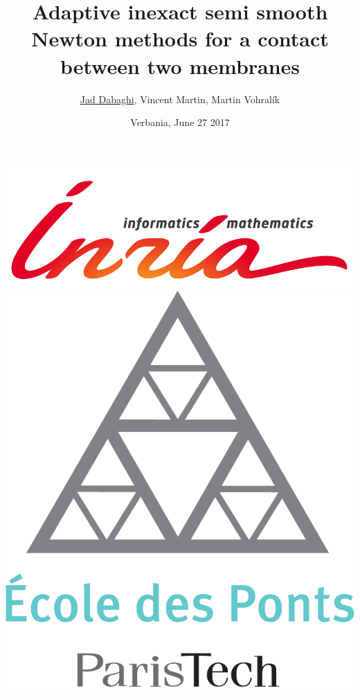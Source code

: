 \documentclass[10 pt]{beamer}
\title[ADMOS 2017]{Adaptive inexact semi smooth Newton methods for a contact between two membranes}
\author[Jad Dabaghi]{\underline{Jad Dabaghi}, Vincent Martin, Martin Vohral\'ik}
\institute[]{Inria Paris \& Université Paris-Est}
\date{Verbania, June 27 2017}
\begin{document}
\begin{frame}
\maketitle
\includegraphics[scale=0.3]{INRIA-SCIENTIFIQUE-UK-RVB}
\hfill \includegraphics[scale=0.08]{Logo_ponts_paristech}

\end{frame}
\end{document}

